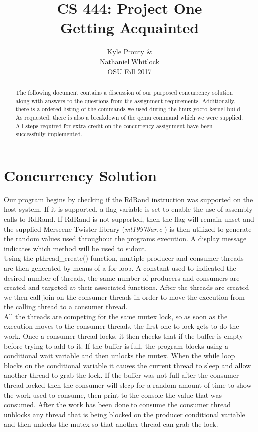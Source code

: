 \documentclass[letterpaper,10pt]{article}
\title{\bf CS 444: Project One\\\Large{Getting Acquainted}}
\author{Kyle Prouty \&\\Nathaniel Whitlock\\OSU Fall 2017}
\begin{document}
\begin{titlingpage}
    \maketitle   
    \vspace{1in}
    \begin{abstract}
      \noindent The following document contains a discussion of our purposed concurrency solution along with answers to the questions from the assignment requirements. Additionally, there is a ordered listing of the commands we used during the linux-yocto kernel build. As requested, there is also a breakdown of the qemu command which we were supplied. All steps required for extra credit on the concurrency assignment have been successfully implemented.
    \end{abstract}
\end{titlingpage}

\section{Concurrency Solution} 
Our program begins by checking if the RdRand instruction was supported on the host system. If it is supported, a flag variable is set to enable  the use of assembly calls to RdRand. If RdRand is not supported, then the flag will remain unset and the supplied Merseene Twister library (\textit{mt19973ar.c }) is then utilized to generate the random values used throughout the programs execution. A display message indicates which method will be used to stdout. \\

Using the pthread\_create() function, multiple producer and consumer threads are then generated by means of a for loop. A constant used to indicated the desired number of threads, the same number of producers and consumers are created and targeted at their associated functions. After the threads are created we then call join on the consumer threads in order to move the execution from the calling thread to a consumer thread. \\

All the threads are competing for the same mutex lock, so as soon as the execution moves to the consumer threads, the first one to lock gets to do the work. Once a consumer thread locks, it then checks that if the buffer is empty before trying to add to it. If the buffer is full, the program blocks using a conditional wait variable and then unlocks the mutex. When the while loop blocks on the conditional variable it causes the current thread to sleep and allow another thread to grab the lock. If the buffer was not full after the consumer thread locked then the consumer will sleep for a random amount of time to show the work used to consume, then print to the console the value that was consumed. After the work has been done to consume the consumer thread unblocks any thread that is being blocked on the producer conditional variable and then unlocks the mutex so that another thread can grab the lock. \\
\end{document}
